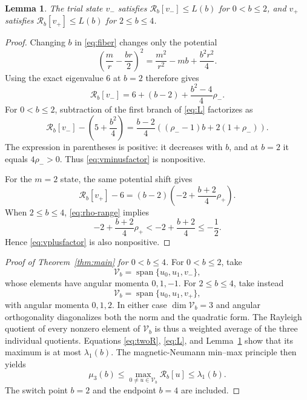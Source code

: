 \documentclass[11pt]{article}
\newtheorem{lemma}[theorem]{Lemma}
\newcommand{\Rb}{\mathcal R_b}
\begin{document}
\begin{lemma}\label{lem:third}
The trial state $v_-$ satisfies $\Rb[v_-]\leq L(b)$ for $0<b\leq2$,
and $v_+$ satisfies $\Rb[v_+]\leq L(b)$ for $2\leq b\leq4$.
\end{lemma}

\begin{proof}
Changing $b$ in \eqref{eq:fiber} changes only the potential
\[
  \left(\frac mr-\frac{br}{2}\right)^2
  =\frac{m^2}{r^2}-mb+\frac{b^2r^2}{4}.
\]
Using the exact eigenvalue $6$ at $b=2$ therefore gives
\begin{equation}\label{eq:vminusR}
  \Rb[v_-]=6+(b-2)+\frac{b^2-4}{4}\rho_-.
\end{equation}
For $0<b\leq2$, subtraction of the first branch of \eqref{eq:L}
factorizes as
\begin{equation}\label{eq:vminusfactor}
  \Rb[v_-]-\left(5+\frac{b^2}{4}\right)
  =\frac{b-2}{4}
   \left((\rho_--1)b+2(1+\rho_-)\right).
\end{equation}
The expression in parentheses is positive: it decreases with $b$, and at
$b=2$ it equals $4\rho_->0$.  Thus \eqref{eq:vminusfactor} is nonpositive.

For the $m=2$ state, the same potential shift gives
\begin{equation}\label{eq:vplusfactor}
  \Rb[v_+]-6=(b-2)
  \left(-2+\frac{b+2}{4}\rho_+\right).
\end{equation}
When $2\leq b\leq4$, \eqref{eq:rho-range} implies
\[
  -2+\frac{b+2}{4}\rho_+
  <-2+\frac{b+2}{4}\leq-\frac12.
\]
Hence \eqref{eq:vplusfactor} is also nonpositive.
\end{proof}

\begin{proof}[Proof of Theorem~\ref{thm:main} for $0<b\leq4$]
For $0<b\leq2$, take
\[
  \mathcal V_b=\operatorname{span}\{u_0,u_1,v_-\},
\]
whose elements have angular momenta $0,1,-1$.  For $2\leq b\leq4$,
take instead
\[
  \mathcal V_b=\operatorname{span}\{u_0,u_1,v_+\},
\]
with angular momenta $0,1,2$.  In either case $\dim\mathcal V_b=3$ and
angular orthogonality diagonalizes both the norm and the quadratic form.
The Rayleigh quotient of every nonzero element of $\mathcal V_b$ is thus a
weighted average of the three individual quotients.  Equations
\eqref{eq:twoR}, \eqref{eq:L}, and Lemma~\ref{lem:third} show that its
maximum is at most $\lambda_1(b)$.  The magnetic-Neumann min--max principle
then yields
\[
  \mu_3(b)\leq
  \max_{0\ne u\in\mathcal V_b}\Rb[u]
  \leq\lambda_1(b).
\]
The switch point $b=2$ and the endpoint $b=4$ are included.
\end{proof}
\end{document}
